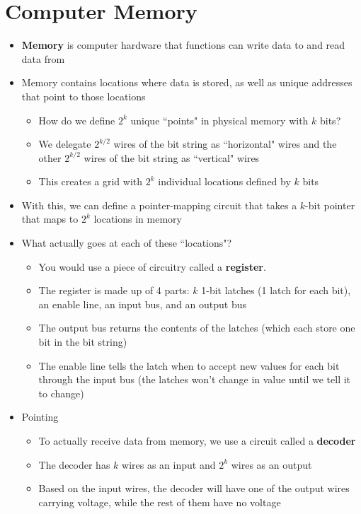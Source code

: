 \documentclass{article}
\begin{document}
\section{Computer Memory}
\begin{itemize}
	\item \textbf{Memory} is computer hardware that functions can write data to and read data from
	\item Memory contains locations where data is stored, as well as unique addresses that point to those locations
		\begin{itemize}
			\item How do we define $2^k$ unique ``points" in physical memory with $k$ bits?
			\item We delegate $2^{{k}/{2}}$ wires of the bit string as ``horizontal" wires and the other $2^{k/2}$ wires of the bit string as ``vertical" wires
			\item This creates a grid with $2^k$ individual locations defined by $k$ bits
		\end{itemize}
	\item With this, we can define a pointer-mapping circuit that takes a $k$-bit pointer that maps to $2^k$ locations in memory
	\item What actually goes at each of these ``locations"?
		\begin{itemize}
			\item You would use a piece of circuitry called a \textbf{register}.
			\item The register is made up of 4 parts: $k$ 1-bit latches (1 latch for each bit), an enable line, an input bus, and an output bus
			\item The output bus returns the contents of the latches (which each store one bit in the bit string)
			\item The enable line tells the latch when to accept new values for each bit through the input bus (the latches won't change in value until we tell it to change)
		\end{itemize}
	\item Pointing
		\begin{itemize}
			\item To actually receive data from memory, we use a circuit called a \textbf{decoder}
			\item The decoder has $k$ wires as an input and $2^k$ wires as an output
			\item Based on the input wires, the decoder will have one of the output wires carrying voltage, while the rest of them have no voltage

\end{itemize}
\end{itemize}
\end{document}
